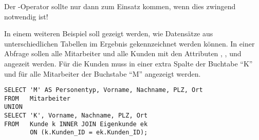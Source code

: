           \begin{merke}
            Der -Operator sollte nur dann zum Einsatz kommen, wenn dies zwingend notwendig ist!
          \end{merke}
		  \clearpage
          In einem weiteren Beispiel soll gezeigt werden, wie Datensätze aus unterschiedlichen Tabellen im Ergebnis gekennzeichnet werden können. In einer Abfrage sollen alle Mitarbeiter und alle Kunden mit den Attributen , ,  und  angezeit werden. Für die Kunden muss in einer extra Spalte der Buchtabe \enquote{K} und für alle Mitarbeiter der Buchstabe \enquote{M} angezeigt werden.
          \begin{lstlisting}[language=oracle_sql,caption={Spalten mit konstanten Werten und UNION},label=sql04_24]
SELECT 'M' AS Personentyp, Vorname, Nachname, PLZ, Ort
FROM   Mitarbeiter
UNION
SELECT 'K', Vorname, Nachname, PLZ, Ort
FROM   Kunde k INNER JOIN Eigenkunde ek
       ON (k.Kunden_ID = ek.Kunden_ID);
          \end{lstlisting}
